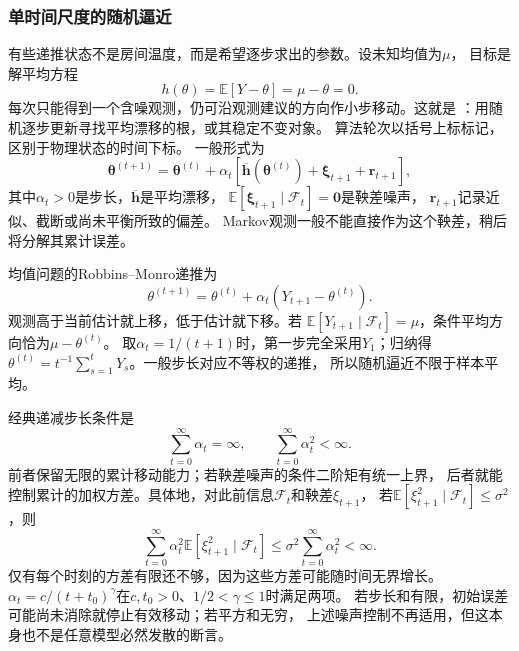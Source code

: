 \subsubsection{单时间尺度的随机逼近}
\label{sec:stoch-approximation-markov-noise}

有些递推状态不是房间温度，而是希望逐步求出的参数。设未知均值为$\mu$，
目标是解平均方程
\begin{equation}
  h(\theta)=\mathbb E[Y-\theta]=\mu-\theta=0.
  \label{eq:stoch-mean-root}
\end{equation}
每次只能得到一个含噪观测，仍可沿观测建议的方向作小步移动。这就是
：用随机逐步更新寻找平均漂移的根，或其稳定不变对象。
算法轮次以括号上标标记，区别于物理状态的时间下标。
一般形式为
\begin{equation}
  \bm\theta^{(t+1)}=\bm\theta^{(t)}+\alpha_t
   [\overline{\bm h}(\bm\theta^{(t)})+\bm\xi_{t+1}+\bm r_{t+1}],
  \label{eq:stoch-general-stochastic-approximation}
\end{equation}
其中$\alpha_t>0$是步长，$\overline{\bm h}$是平均漂移，
$\mathbb E[\bm\xi_{t+1}\mid\mathcal F_t]=\bm0$是鞅差噪声，
$\bm r_{t+1}$记录近似、截断或尚未平衡所致的偏差。
Markov观测一般不能直接作为这个鞅差，稍后将分解其累计误差。

均值问题的Robbins--Monro递推为
\begin{equation}
  \theta^{(t+1)}=\theta^{(t)}
       +\alpha_t(Y_{t+1}-\theta^{(t)}).
  \label{eq:stoch-robbins-monro-mean}
\end{equation}
观测高于当前估计就上移，低于估计就下移。若
$\mathbb E[Y_{t+1}\mid\mathcal F_t]=\mu$，条件平均方向恰为$\mu-\theta^{(t)}$。
取$\alpha_t=1/(t+1)$时，第一步完全采用$Y_1$；归纳得
$\theta^{(t)}=t^{-1}\sum_{s=1}^tY_s$。一般步长对应不等权的递推，
所以随机逼近不限于样本平均。

经典递减步长条件是
\begin{equation}
  \sum_{t=0}^\infty\alpha_t=\infty,\qquad
  \sum_{t=0}^\infty\alpha_t^2<\infty.
  \label{eq:stoch-robbins-monro-stepsizes}
\end{equation}
前者保留无限的累计移动能力；若鞅差噪声的条件二阶矩有统一上界，
后者就能控制累计的加权方差。具体地，对此前信息$\mathcal F_t$和鞅差$\xi_{t+1}$，
若$\mathbb E[\xi_{t+1}^2\mid\mathcal F_t]\leq\sigma^2$，则
\[
 \sum_{t=0}^\infty\alpha_t^2
 \mathbb E[\xi_{t+1}^2\mid\mathcal F_t]
 \leq\sigma^2\sum_{t=0}^\infty\alpha_t^2<\infty.
\]
仅有每个时刻的方差有限还不够，因为这些方差可能随时间无界增长。
$\alpha_t=c/(t+t_0)^\gamma$在$c,t_0>0$、$1/2<\gamma\leq1$时满足两项。
若步长和有限，初始误差可能尚未消除就停止有效移动；若平方和无穷，
上述噪声控制不再适用，但这本身也不是任意模型必然发散的断言。

